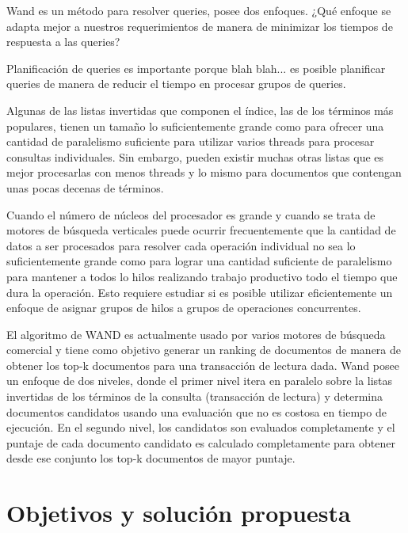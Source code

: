 Wand es un método para resolver queries, posee dos enfoques. ¿Qué enfoque se adapta mejor a nuestros requerimientos de manera de minimizar los tiempos de respuesta a las queries? 

Planificación de queries es importante porque blah blah... es posible planificar queries de manera de reducir el tiempo en procesar grupos de queries.  




Algunas de las listas invertidas que componen el índice, las de los términos más populares, tienen un tamaño lo suficientemente grande como para ofrecer una cantidad de paralelismo suficiente para utilizar varios threads para procesar consultas individuales. Sin embargo, pueden existir muchas otras listas que es mejor procesarlas con menos threads y lo mismo para documentos que contengan unas pocas decenas de términos. 

Cuando el número de núcleos del procesador es grande y cuando se trata de motores de búsqueda verticales puede ocurrir frecuentemente que la cantidad de datos a ser procesados para resolver cada operación individual no sea lo suficientemente grande como para lograr una cantidad suficiente de paralelismo para mantener a todos lo hilos realizando trabajo productivo todo el tiempo que dura la operación. Esto requiere estudiar si es posible utilizar eficientemente un enfoque de asignar grupos de hilos a grupos de operaciones concurrentes.

El algoritmo de WAND es actualmente usado por varios motores de búsqueda comercial y tiene como objetivo generar un ranking de documentos de manera de obtener los top-k documentos para una transacción de lectura dada. Wand posee un enfoque de dos niveles, donde el primer nivel itera en paralelo sobre la listas invertidas de los términos de la consulta (transacción de lectura) y determina documentos candidatos usando una evaluación que no es costosa en tiempo de ejecución. En el segundo nivel, los candidatos son evaluados completamente  y el puntaje de cada documento candidato es calculado completamente para obtener desde ese conjunto los top-k documentos de mayor puntaje.





\section{Objetivos y solución propuesta}
\label{intro:objetivosysolucion}

